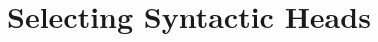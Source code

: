 \documentclass[11pt,a4paper]{article}
\def\RR#1{{\color{blue}RR: \it #1}}
\def\DM#1{{\color{red}DM: \it #1}}
\def\RR#1{}
\def\DM#1{}
\begin{document}



\section{Selecting Syntactic Heads}
\label{sec:head-selection}
\end{document}
